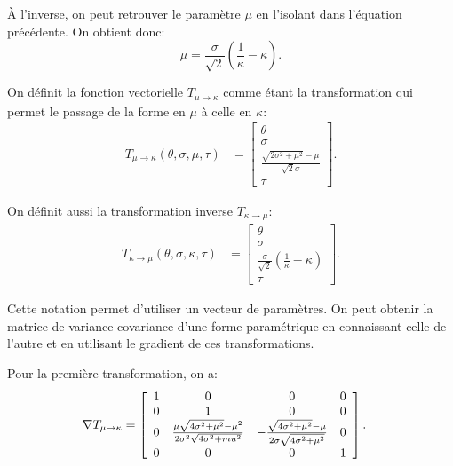 À l'inverse, on peut retrouver le paramètre $\mu$ en l'isolant dans
l'équation précédente. On obtient donc:
\begin{equation}
  \label{eq:kappamu}
  \mu = \frac{\sigma}{\sqrt{2}}\left(\frac{1}{\kappa}-\kappa \right).
\end{equation}

On définit la fonction vectorielle $T_{\mu\rightarrow\kappa}$ comme
étant la transformation qui permet le passage de la forme en $\mu$ à
celle en $\kappa$:
\begin{align}
  T_{\mu\rightarrow\kappa}(\theta, \sigma, \mu, \tau) &=
  \left[\begin{array}{c} \theta \\ \sigma \\
      \frac{\sqrt{2\sigma^2+\mu^2}-\mu}{\sqrt{2}\sigma} \\ \tau
    \end{array}\right].
\end{align}

On définit aussi la transformation inverse $T_{\kappa\rightarrow\mu}$:
\begin{align}
  T_{\kappa\rightarrow\mu}(\theta, \sigma, \kappa, \tau) &=
  \left[\begin{array}{c} \theta \\ \sigma \\
      \frac{\sigma}{\sqrt{2}}\left(\frac{1}{\kappa}-\kappa \right) \\
      \tau
    \end{array}\right].
\end{align}

Cette notation permet d'utiliser un vecteur de paramètres. On peut
obtenir la matrice de variance-covariance d'une forme paramétrique en
connaissant celle de l'autre et en utilisant le gradient de ces
transformations.

Pour la première transformation, on a:
\begin{align}
  \nabla T_{\mu\rightarrow\kappa} &= \left[
    \begin{array}[]{cccc}
      1&0&0&0 \\
      0&1&0&0 \\
      0&\frac{\mu\sqrt{4\sigma^2+\mu^2}-\mu^2}{2\sigma^2\sqrt{4\sigma^2+mu^2}} & -\frac{\sqrt{4\sigma^2+\mu^2}-\mu}{2\sigma\sqrt{4\sigma^2+\mu^2}} & 0 \\
      0&0&0&1
    \end{array}
  \right].
\end{align}

